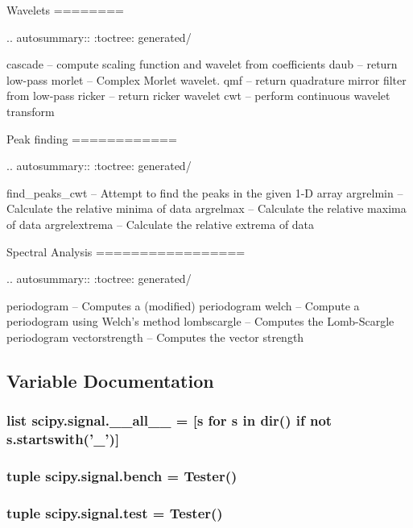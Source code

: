\begin{DoxyVerb}
Wavelets
========

.. autosummary::
   :toctree: generated/

   cascade  -- compute scaling function and wavelet from coefficients
   daub     -- return low-pass
   morlet   -- Complex Morlet wavelet.
   qmf      -- return quadrature mirror filter from low-pass
   ricker   -- return ricker wavelet
   cwt      -- perform continuous wavelet transform

Peak finding
============

.. autosummary::
   :toctree: generated/

   find_peaks_cwt -- Attempt to find the peaks in the given 1-D array
   argrelmin      -- Calculate the relative minima of data
   argrelmax      -- Calculate the relative maxima of data
   argrelextrema  -- Calculate the relative extrema of data

Spectral Analysis
=================

.. autosummary::
   :toctree: generated/

   periodogram    -- Computes a (modified) periodogram
   welch          -- Compute a periodogram using Welch's method
   lombscargle    -- Computes the Lomb-Scargle periodogram
   vectorstrength -- Computes the vector strength\end{DoxyVerb}
 

\subsection{Variable Documentation}
\hypertarget{namespacescipy_1_1signal_a015d8d778f01ce16aeaba6d7cba90fef}{}
\subsubsection[{\+\_\+\+\_\+all\+\_\+\+\_\+}]{\setlength{\rightskip}{0pt plus 5cm}list scipy.\+signal.\+\_\+\+\_\+all\+\_\+\+\_\+ = \mbox{[}{\bf s} for {\bf s} in dir() {\bf if} not s.\+startswith('\+\_\+')\mbox{]}}\label{namespacescipy_1_1signal_a015d8d778f01ce16aeaba6d7cba90fef}
\hypertarget{namespacescipy_1_1signal_a71e6242ecfc7f1dc2f1bcd042617ff96}{}
\subsubsection[{bench}]{\setlength{\rightskip}{0pt plus 5cm}tuple scipy.\+signal.\+bench = Tester()}\label{namespacescipy_1_1signal_a71e6242ecfc7f1dc2f1bcd042617ff96}
\hypertarget{namespacescipy_1_1signal_a80e4b5ecb4456e321bc6461d7e9caf78}{}
\subsubsection[{test}]{\setlength{\rightskip}{0pt plus 5cm}tuple scipy.\+signal.\+test = Tester()}\label{namespacescipy_1_1signal_a80e4b5ecb4456e321bc6461d7e9caf78}

